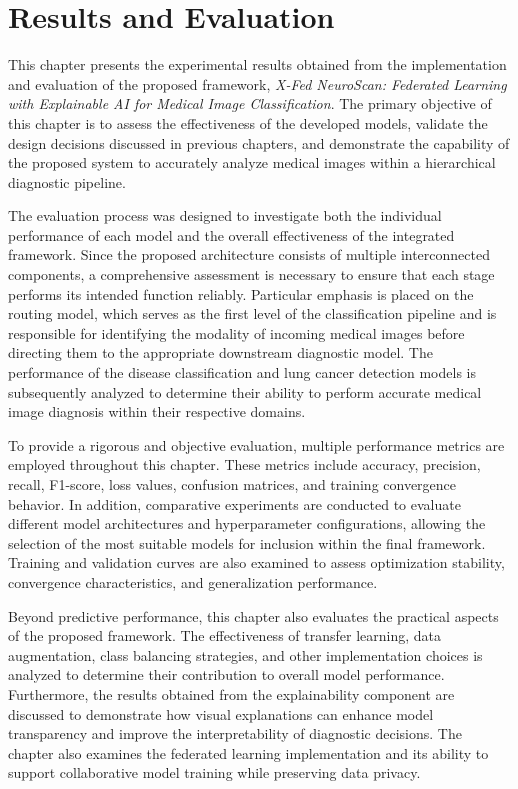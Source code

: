\chapter{Results and Evaluation}

This chapter presents the experimental results obtained from the implementation and evaluation of the proposed framework, \textit{X-Fed NeuroScan: Federated Learning with Explainable AI for Medical Image Classification}. The primary objective of this chapter is to assess the effectiveness of the developed models, validate the design decisions discussed in previous chapters, and demonstrate the capability of the proposed system to accurately analyze medical images within a hierarchical diagnostic pipeline.

The evaluation process was designed to investigate both the individual performance of each model and the overall effectiveness of the integrated framework. Since the proposed architecture consists of multiple interconnected components, a comprehensive assessment is necessary to ensure that each stage performs its intended function reliably. Particular emphasis is placed on the routing model, which serves as the first level of the classification pipeline and is responsible for identifying the modality of incoming medical images before directing them to the appropriate downstream diagnostic model. The performance of the disease classification and lung cancer detection models is subsequently analyzed to determine their ability to perform accurate medical image diagnosis within their respective domains.

To provide a rigorous and objective evaluation, multiple performance metrics are employed throughout this chapter. These metrics include accuracy, precision, recall, F1-score, loss values, confusion matrices, and training convergence behavior. In addition, comparative experiments are conducted to evaluate different model architectures and hyperparameter configurations, allowing the selection of the most suitable models for inclusion within the final framework. Training and validation curves are also examined to assess optimization stability, convergence characteristics, and generalization performance.

Beyond predictive performance, this chapter also evaluates the practical aspects of the proposed framework. The effectiveness of transfer learning, data augmentation, class balancing strategies, and other implementation choices is analyzed to determine their contribution to overall model performance. Furthermore, the results obtained from the explainability component are discussed to demonstrate how visual explanations can enhance model transparency and improve the interpretability of diagnostic decisions. The chapter also examines the federated learning implementation and its ability to support collaborative model training while preserving data privacy.


